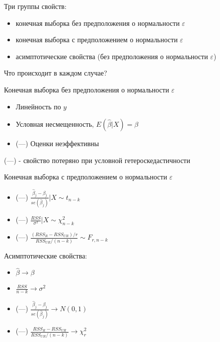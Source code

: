 \documentclass[ignorenonframetext,]{beamer}
\begin{document}
\begin{frame}{Три группы свойств:}

\begin{itemize}
\item
  конечная выборка без предположения о нормальности \(\varepsilon\)
\item
  конечная выборка с предположением о нормальности \(\varepsilon\)
\item
  асимптотические свойства (без предположения о нормальности
  \(\varepsilon\))
\end{itemize}

Что происходит в каждом случае?

\end{frame}

\begin{frame}{Конечная выборка без предположения о нормальности
\(\varepsilon\)}

\begin{itemize}
\item
  Линейность по \(y\)
\item
  Условная несмещенность, \(E(\hat{\beta}|X)=\beta\)
\item
  (---) Оценки неэффективны
\end{itemize}

(---) - свойство потеряно при условной гетероскедастичности

\end{frame}

\begin{frame}{Конечная выборка с предположением о нормальности
\(\varepsilon\)}

\begin{itemize}
\item
  (---)
  \(\frac{\hat{\beta}_j-\beta_j}{se(\hat{\beta}_j)} | X \sim t_{n-k}\)
\item
  (---) \(\frac{RSS}{\sigma^2} |X \sim \chi^2_{n-k}\)
\item
  (---) \(\frac{(RSS_R-RSS_{UR})/r}{RSS_{UR}/(n-k)} \sim F_{r,n-k}\)
\end{itemize}

\end{frame}

\begin{frame}{Асимптотические свойства:}

\begin{itemize}
\item
  \(\hat{\beta} \to \beta\)
\item
  \(\frac{RSS}{n-k} \to \sigma^2\)
\item
  (---) \(\frac{\hat{\beta}_j-\beta_j}{se(\hat{\beta}_j)} \to N(0,1)\)
\item
  (---) \(\frac{RSS_R-RSS_{UR}}{RSS_{UR}/(n-k)} \to \chi^2_r\)
\end{itemize}

\end{frame}
\end{document}
